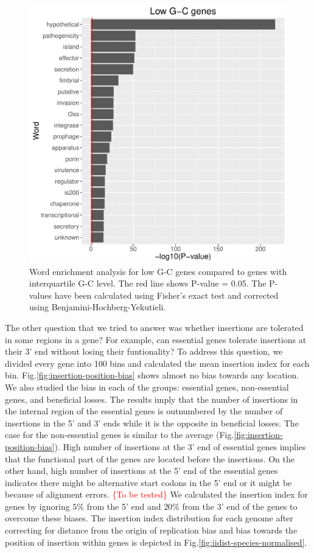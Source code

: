 \documentclass[12pt,letterpaper]{article}
\begin{document}
\begin{figure}
\includegraphics[scale=0.55]{lowgc-pval.pdf}
\caption{Word enrichment analysis for low G-C genes compared to genes with interquartile G-C level. The red line shows P-value = 0.05. The P-values have been calculated using Fisher's exact test and corrected using Benjamini-Hochberg-Yekutieli.}
\label{fig:gc-pval}
\end{figure}

The other question that we tried to answer was whether insertions are tolerated in some regions in a gene? For example, can essential genes tolerate insertions at their 3' end without losing their funtionality? To address this question, we divided every gene into 100 bins and calculated the mean insertion index for each bin. Fig.\@ \ref{fig:insertion-position-bias} shows almost no bias towards any location. We also studied the bias in each of the groups: essential genes, non-essential genes, and beneficial losses. The results imply that the number of insertions in the internal region of the essential genes is outnumbered by the number of insertions in the 5' and 3' ends while it is the opposite in beneficial losses. The case for the non-essential genes is similar to the average (Fig.\@ \ref{fig:insertion-position-bias}). High number of insertions at the 3' end of essential genes implies that the functional part of the genes are located before the insertions. On the other hand, high number of insertions at the 5' end of the essential genes indicates there might be alternative start codons in the 5' end or it might be because of alignment errors. \textcolor{red}{\{To be tested\}} We calculated the insertion index for genes by ignoring $5\%$ from the 5' end and $20\%$ from the 3' end of the genes to overcome these biases. The insertion index distribution for each genome after correcting for distance from the origin of replication bias and bias towards the position of insertion within genes is depicted in Fig.\@ \ref{fig:iidist-species-normalised}.
\end{document}
